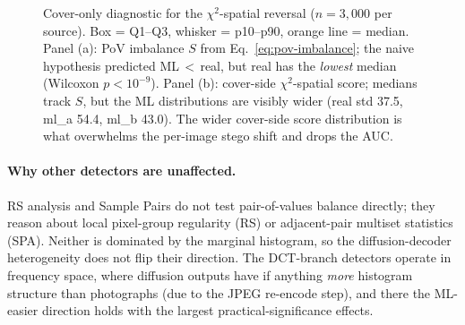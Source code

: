 \documentclass[10pt,twocolumn,a4paper]{article}
\begin{document}
\begin{figure}[t]
\caption{Cover-only diagnostic for the $\chi^2$-spatial reversal ($n\!=\!3{,}000$ per source). Box = Q1--Q3, whisker = p10--p90, orange line = median. Panel (a): PoV imbalance $S$ from Eq.~\ref{eq:pov-imbalance}; the naive hypothesis predicted ML\,$<$\,real, but real has the \emph{lowest} median (Wilcoxon $p\!<\!10^{-9}$). Panel (b): cover-side $\chi^2$-spatial score; medians track $S$, but the ML distributions are visibly wider (real std 37.5, ml\_a 54.4, ml\_b 43.0). The wider cover-side score distribution is what overwhelms the per-image stego shift and drops the AUC.}
\label{fig:pov}
\end{figure}

\paragraph{Why other detectors are unaffected.} RS analysis and Sample Pairs do not test pair-of-values balance directly; they reason about local pixel-group regularity (RS) or adjacent-pair multiset statistics (SPA). Neither is dominated by the marginal histogram, so the diffusion-decoder heterogeneity does not flip their direction. The DCT-branch detectors operate in frequency space, where diffusion outputs have if anything \emph{more} histogram structure than photographs (due to the JPEG re-encode step), and there the ML-easier direction holds with the largest practical-significance effects.
\end{document}
